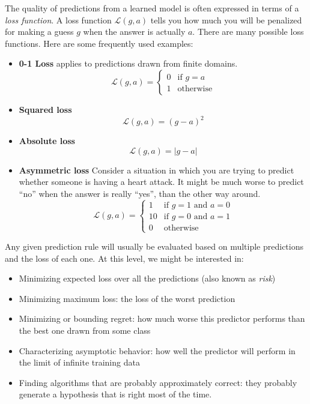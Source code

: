 The quality of predictions from a learned model is often
expressed in terms of a {\em loss function}.  A
loss function $\mathcal{L}(g, a)$ tells you how much you will be penalized
for making a guess $g$ when the answer is actually $a$.  There are many possible loss
functions.  Here are some frequently used examples:
\begin{itemize}
  \item {\bf 0-1 Loss} applies to predictions drawn from finite
        domains.
        \[\mathcal{L}(g, a) = \begin{cases}
            0 & \text{if $g = a$} \\
            1 & \text{otherwise}
          \end{cases}\]
  \item {\bf Squared loss}
        \[\mathcal{L}(g, a) = (g - a)^2\]
  \item {\bf Absolute loss}
        \[\mathcal{L}(g, a) = |g - a|\]
  \item {\bf Asymmetric loss}
        Consider a situation in which  you are trying to predict whether
        someone is having a heart attack.  It might be much worse to predict
        ``no'' when the answer is really ``yes'', than the other way around.
        \[\mathcal{L}(g, a) = \begin{cases}
            1  & \text{if $g = 1$ and $a = 0$} \\
            10 & \text{if $g = 0$ and $a = 1$} \\
            0  & \text{otherwise}
          \end{cases}\]
\end{itemize}

Any given prediction rule will usually be evaluated based on multiple predictions and the loss of each one.  At this level, we might be interested in:
\begin{itemize}
  \item Minimizing expected loss over all the predictions (also known as {\em risk})
  \item Minimizing maximum loss: the loss of the worst prediction
  \item Minimizing or bounding regret: how much worse this predictor performs than the best one drawn from some class
  \item Characterizing asymptotic behavior: how well the predictor will perform in the limit of infinite training data
  \item Finding algorithms that are probably approximately correct:  they probably generate a hypothesis that is right most of the time.
\end{itemize}

